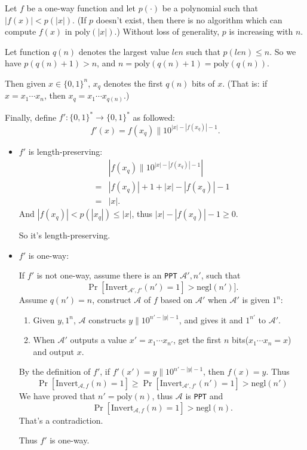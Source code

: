 \documentclass[a4paper]{article}
\newcommand{\poly}{\text{poly}}
\newcommand{\negl}{\text{negl}}
\newcommand{\Invert}{\text{Invert}}
\newcommand{\A}{\mathcal{A}}
\newenvironment{problem}[2][Problem]{\begin{trivlist}
\item[\hskip \labelsep {\bfseries #1}\hskip \labelsep {\bfseries #2.}]}{\end{trivlist}}
\begin{document}
\begin{problem}{7.3}
Let $f$ be a one-way function and let $p(\cdot)$ be a polynomial such
that $|f(x)|<p(|x|)$. (If $p$ doesn't exist, then there is no algorithm which can compute $f(x)$ in $\poly(|x|)$.) Without loss of generality, $p$ is increasing with $n$.\par
Let function $q(n)$ denotes the largest value $len$ such that $p(len)\le n$. So we have $p(q(n)+1)>n$, and $n=\poly(q(n)+1)=\poly(q(n))$.\par 
Then given $x\in\{0,1\}^n$, $x_q$ denotes the first $q(n)$ bits of $x$. (That is: if $x=x_1\cdots x_n$, then $x_q=x_1\cdots x_{q(n)}$.)\par
Finally, define $f':\{0,1\}^*\rightarrow\{0,1\}^*$ as followed: 
\[f'(x)=f(x_q)\|10^{|x|-|f(x_q)|-1}.\]
\begin{itemize}
    \item $f'$ is length-preserving:
    \begin{align*}
        &|f(x_q)\|10^{|x|-|f(x_q)|-1}|\\
        =&|f(x_q)|+1+|x|-|f(x_q)|-1\\
        =&|x|.
    \end{align*}
    And $|f(x_q)|<p(|x_q|)\le |x|$, thus $|x|-|f(x_q)|-1\ge0$.\par
    So it's length-preserving.
    \item $f'$ is one-way:\par
    If $f'$ is not one-way, assume there is an \texttt{PPT} $\A',n'$, such that \[\Pr[\Invert_{\A',f'}(n')=1]>\negl(n')].\]
    Assume $q(n')=n$, construct $\A$ of $f$ based on $\A'$ when $\A'$ is given $1^n$:
  \begin{enumerate}
      \item Given $y,1^n$, $\A$ constructs $y\|10^{n'-|y|-1}$, and gives it and $1^{n'}$ to $\A'$.
      \item When $\A'$ outputs a value $x'=x_1\cdots x_{n'}$, get the first $n$ bits($x_1\cdots x_n=x$) and output $x$.  
  \end{enumerate}
  By the definition of $f'$, if $f'(x')=y\|10^{n'-|y|-1}$, then $f(x)=y$. Thus\[\Pr[\Invert_{\A,f}(n)=1]\ge\Pr[\Invert_{\A',f'}(n')=1]>\negl(n')\]
  We have proved that $n'=\poly(n)$, thus $\A$ is \texttt{PPT} and 
  \[\Pr[\Invert_{\A,f}(n)=1]>\negl(n).\]
  That's a contradiction.\par
  Thus $f'$ is one-way.
\end{itemize}

\end{problem}
\end{document}
